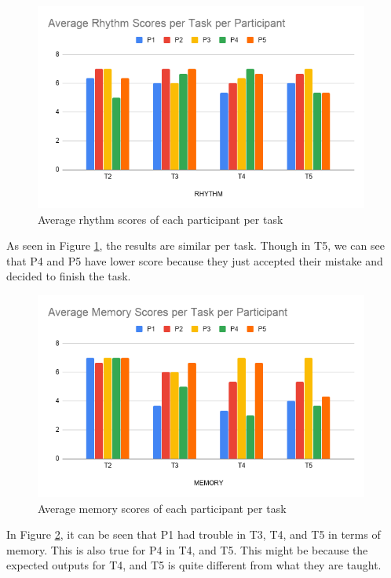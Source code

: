 \begin{figure}[H]
    \centering
    \includegraphics[width=11cm]{figures/Results/AverageRhythm.png}
    \caption{Average rhythm scores of each participant per task}
    \label{fig:AverageRhythm}
\end{figure}

As seen in Figure \ref{fig:AverageRhythm}, the results are similar per task. Though in T5, we can see that P4 and P5 have lower score because they just accepted their mistake and decided to finish the task.

\begin{figure}[H]
    \centering
    \includegraphics[width=11cm]{figures/Results/AverageMemory.png}
    \caption{Average memory scores of each participant per task}
    \label{fig:AverageMemory}
\end{figure}

In Figure \ref{fig:AverageMemory}, it can be seen that P1 had trouble in T3, T4, and T5 in terms of memory. This is also true for P4 in T4, and T5. This might be because the expected outputs for T4, and T5 is quite different from what they are taught. 

